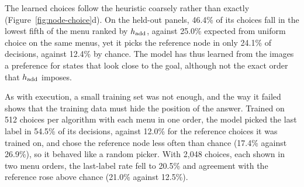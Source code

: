 The learned choices follow the heuristic coarsely rather than exactly (Figure~\ref{fig:node-choice}d). On the held-out panels, 46.4\% of its choices fall in the lowest fifth of the menu ranked by $h_{\rm add}$, against 25.0\% expected from uniform choice on the same menus, yet it picks the reference node in only 24.1\% of decisions, against 12.4\% by chance. The model has thus learned from the images a preference for states that look close to the goal, although not the exact order that $h_{\rm add}$ imposes.

As with execution, a small training set was not enough, and the way it failed shows that the training data must hide the position of the answer. Trained on 512 choices per algorithm with each menu in one order, the model picked the last label in 54.5\% of its decisions, against 12.0\% for the reference choices it was trained on, and chose the reference node less often than chance (17.4\% against 26.9\%), so it behaved like a random picker. With 2,048 choices, each shown in two menu orders, the last-label rate fell to 20.5\% and agreement with the reference rose above chance (21.0\% against 12.5\%).

